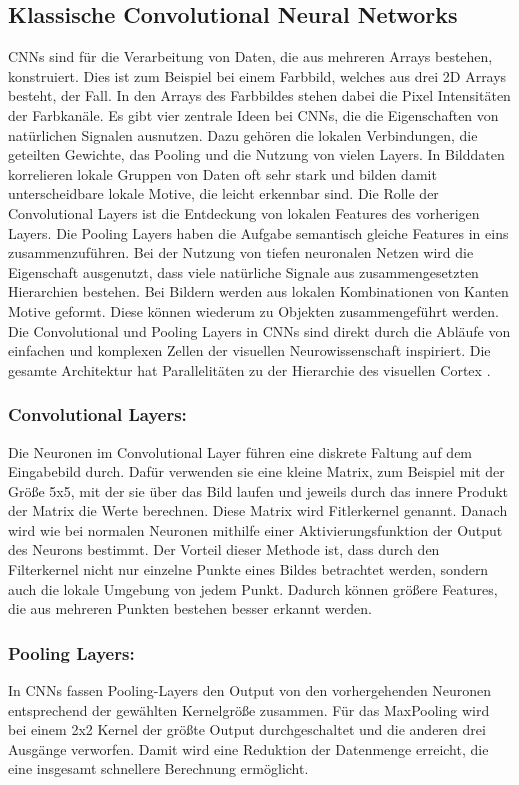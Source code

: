 \documentclass[runningheads,a4paper]{llncs}[2015/06/24]
\begin{document}
\subsection{Klassische Convolutional Neural Networks}
CNNs sind für die Verarbeitung von Daten, die aus mehreren Arrays bestehen, konstruiert. Dies ist zum Beispiel bei einem Farbbild, welches aus drei 2D Arrays besteht, der Fall. In den Arrays des Farbbildes stehen dabei die Pixel Intensitäten der Farbkanäle. Es gibt vier zentrale Ideen bei CNNs, die die Eigenschaften von natürlichen Signalen ausnutzen. Dazu gehören die lokalen Verbindungen, die geteilten Gewichte, das Pooling und die Nutzung von vielen Layers. In Bilddaten korrelieren lokale Gruppen von Daten oft sehr stark und bilden damit unterscheidbare lokale Motive, die leicht erkennbar sind. Die Rolle der Convolutional Layers ist die Entdeckung von lokalen Features des vorherigen Layers. Die Pooling Layers haben die Aufgabe semantisch gleiche Features in eins zusammenzuführen. Bei der Nutzung von tiefen neuronalen Netzen wird die Eigenschaft ausgenutzt, dass viele natürliche Signale aus zusammengesetzten Hierarchien bestehen. Bei Bildern werden aus lokalen Kombinationen von Kanten Motive geformt. Diese können wiederum zu Objekten zusammengeführt werden. Die Convolutional und Pooling Layers in CNNs sind direkt durch die Abläufe von einfachen und komplexen Zellen der visuellen Neurowissenschaft inspiriert. Die gesamte Architektur hat Parallelitäten zu der Hierarchie des visuellen Cortex \cite{lecun_nature}. 

\subsubsection*{Convolutional Layers:}
Die Neuronen im Convolutional Layer führen eine diskrete Faltung auf dem Eingabebild durch. Dafür verwenden sie eine kleine Matrix, zum Beispiel mit der Größe 5x5, mit der sie über das Bild laufen und jeweils durch das innere Produkt der Matrix die Werte berechnen. Diese Matrix wird Fitlerkernel genannt. Danach wird wie bei normalen Neuronen mithilfe einer Aktivierungsfunktion der Output des Neurons bestimmt. Der Vorteil dieser Methode ist, dass durch den Filterkernel nicht nur einzelne Punkte eines Bildes betrachtet werden, sondern auch die lokale Umgebung von jedem Punkt. Dadurch können größere Features, die aus mehreren Punkten bestehen besser erkannt werden.

\subsubsection*{Pooling Layers:}
In CNNs fassen Pooling-Layers den Output von den vorhergehenden Neuronen entsprechend der gewählten Kernelgröße zusammen. Für das MaxPooling wird bei einem 2x2 Kernel der größte Output durchgeschaltet und die anderen drei Ausgänge verworfen. Damit wird eine Reduktion der Datenmenge erreicht, die eine insgesamt schnellere Berechnung ermöglicht.
\end{document}
